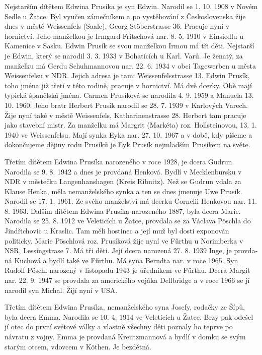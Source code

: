 \documentclass[../dejiny-rodu-prusiku.tex]{subfiles}
\begin{document}
Nejstarším dítětem Edwina Prusíka je syn Edwin. Narodil se 1. 10. 1908 v Novém Sedle u Žatce. Byl vyučen zámečníkem a po vystěhování z Československa žije dnes v městě Weissenfels (Saale), Georg Stöberstrasse 36. Pracuje nyní v hornictví. Jeho manželkou je Irmgard Fritschová nar. 8. 5. 1910 v Einsiedlu u Kamenice v Sasku. Edwin Prusík se svou manželkou Irmou má tři děti. Nejstarší je Edwin, který se narodil 3. 3. 1933 v Bohatících u Karl. Varů. Je ženatý, za manželku má Gerdu Schuhmannovou nar. 22. 6. 1934 v obci Tagewerben u města Weissenfelsu v NDR. Jejich adresa je tam: Weissenfelsstrasse 13. Edwin Prusík, toho jména již třetí v této rodině, pracuje v hornictví. Má dvě dcerky. Obě mají typická španělská jména. Carmen Prusíková se narodila 4. 9. 1959 a Manuela 13. 10. 1960. Jeho bratr Herbert Prusík narodil se 28. 7. 1939 v Karlo­vých Varech. Žije nyní také v městě Weissenfels, Katharinenstrasse 28. Herbert tam pracuje jako stavební mistr. Za manželku má Margrit (Markéta) roz. Hollsteinovou, 13. 1. 1940 ve Weissenfelsu. Mají synka Eyka nar. 27. 10. 1967 a v době, kdy píšeme a dokončujeme dějiny rodu Prusíků je Eyk Prusík nejmladším Prusíkem na světe.

Třetím dítětem Edwina Prusíka narozeného v roce 1928, je dcera Gudrun. Narodila se 9. 8. 1942 a dnes je provdaná Henková. Bydlí v Mecklenbursku v NDR v městečku Langenhanshagen (Kreis Ribnitz). Než se Gudrun vdala za Klause
Henka, měla nemanželského synka a ten se dnes jmenu­je Uwe Prusík. Narodil se 17. 1. 1961. Ze svého manžel­ství má dcerku Cornelii Henkovou nar. 11. 8. 1963.
Dalším dítětem Edwina Prusíka narozeného 1887, byla dcera Marie. Narodila se 25. 8. 1912 ve Veleticích u Žatce, provdala se za Václava Pöschla do Jindřichovic u Kraslic. Tam měli hostinec a její muž byl dosti exponován politicky. Marie Pöschlová roz. Prusíková žije nyní ve Fűrthu u Norimberka v NSR, Lessingstrase 7. Má tři děti. Její dcera narozená 27. 8. 1939 Inge, je provda­ná Kuchová a bydlí také ve Fűrthu. Má syna Berndta nar. v roce 1965. Syn Rudolf Pöschl narozený v listopadu 1943 je úředníkem ve Fűrthu. Dcera Margit nar. 22. 9. 1947 se provdala za amerického vojáka Dellbridge a v roce 1966 se jí narodil syn Michal. Žijí nyní v USA.

Třetím dítětem Edwina Prusíka, nemanželského syna Josefy, rodačky ze Šípů, byla dcera Emma. Narodila se 10. 4. 1914 ve Veleticích u Žatce. Brzy pak odešel jí otec do první světové války a vlastně všechny děti poznaly ho teprve po návratu z vojny. Emma je provdaná Kreutzmannová a bydlí v domku se svým starým otcem, vdovcem v Köthen. Je bezdětná.
\end{document}
